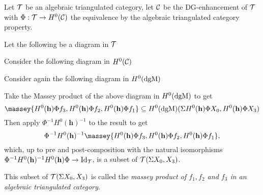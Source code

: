 \begin{definition}
    \label{def:massey_product_alg_tri_cat}
    Let \( {\mathcal{T}} \) be an algebraic triangulated category, let \( {\mathcal{C}} \) be the DG-enhancement of \( {\mathcal{T}} \) with \( \Phi: {\mathcal{T}} \to H^0({\mathcal{C}}) \) the equivalence by the algebraic triangulated category property.
    
    Let the following be a diagram in \( {\mathcal{T}} \)
    \begin{center}
    \end{center}
    Consider the following diagram in \( H^0({\mathcal{C}}) \)
    \begin{center}
    \end{center}
    Consider again the following diagram in \( H^0(\operatorname{dgM}) \)
    \begin{center}
    \end{center}
    Take the Massey product of the above diagram in \( H^0(\operatorname{dgM}) \) to get
    \[
        \massey{H^0(\mathbf{h}) \Phi f_3, H^0(\mathbf{h}) \Phi f_2, H^0(\mathbf{h}) \Phi f_1} \subseteq H^0(\dgM)(\Sigma H^0(\mathbf{h}) \Phi X_0, H^0(\mathbf{h}) \Phi X_3)
    \]
    Then apply \( \Phi^{-1} H^0(\mathbf{h})^{-1} \) to the result to get
    \[
        \Phi^{-1} H^0(\mathbf{h})^{-1} \massey{H^0(\mathbf{h}) \Phi f_3, H^0(\mathbf{h}) \Phi f_2, H^0(\mathbf{h}) \Phi f_1},
    \]
    which, up to pre and post-composition with the natural isomorphisms \( \Phi^{-1} H^0(\mathbf{h})^{-1} H^0(\mathbf{h}) \Phi \to \operatorname{Id}_{{\mathcal{T}}} \), is a subset of \( {\mathcal{T}}(\Sigma X_0, X_3) \).

    This subset of \( {\mathcal{T}}(\Sigma X_0, X_3) \) is called the \emph{massey product of \( f_1, f_2 \) and \( f_3 \) in an algebraic triangulated category}.
\end{definition}

